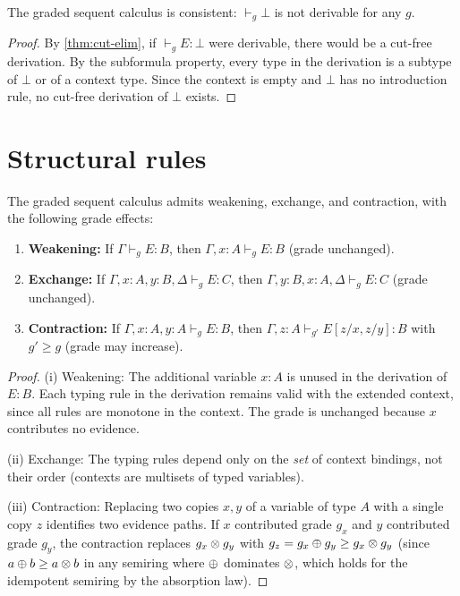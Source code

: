 \begin{corollary}
\label{cor:consistency-cut}
The graded sequent calculus is consistent: $\vdash_g \bot$ is not
derivable for any $g$.
\end{corollary}

\begin{proof}
By \cref{thm:cut-elim}, if $\vdash_g E : \bot$ were derivable, there
would be a cut-free derivation.  By the subformula property, every
type in the derivation is a subtype of $\bot$ or of a context type.
Since the context is empty and $\bot$ has no introduction rule, no
cut-free derivation of $\bot$ exists.
\end{proof}

\section{Structural rules}
\label{sec:structural}

\begin{theorem}
\label{thm:structural}
The graded sequent calculus admits weakening, exchange, and
contraction, with the following grade effects:
\begin{enumerate}[label=(\roman*)]
\item \textbf{Weakening:} If $\Gamma \vdash_g E : B$, then
  $\Gamma, x : A \vdash_g E : B$ (grade unchanged).
\item \textbf{Exchange:} If $\Gamma, x : A, y : B, \Delta \vdash_g
  E : C$, then $\Gamma, y : B, x : A, \Delta \vdash_g E : C$
  (grade unchanged).
\item \textbf{Contraction:} If $\Gamma, x : A, y : A \vdash_g
  E : B$, then $\Gamma, z : A \vdash_{g'} E[z/x, z/y] : B$ with
  $g' \geq g$ (grade may increase).
\end{enumerate}
\end{theorem}

\begin{proof}
(i) Weakening:  The additional variable $x : A$ is unused in
the derivation of $E : B$.  Each typing rule in the derivation
remains valid with the extended context, since all rules are
monotone in the context.  The grade is unchanged because $x$
contributes no evidence.

(ii) Exchange: The typing rules depend only on the \emph{set} of
context bindings, not their order (contexts are multisets of
typed variables).

(iii) Contraction: Replacing two copies $x, y$ of a variable of
type $A$ with a single copy $z$ identifies two evidence paths.
If $x$ contributed grade $g_x$ and $y$ contributed grade $g_y$,
the contraction replaces $g_x \otimes g_y$ with $g_z = g_x \oplus g_y
\geq g_x \otimes g_y$ (since $a \oplus b \geq a \otimes b$ in any
semiring where $\oplus$ dominates $\otimes$, which holds for the
idempotent semiring by the absorption law).
\end{proof}

